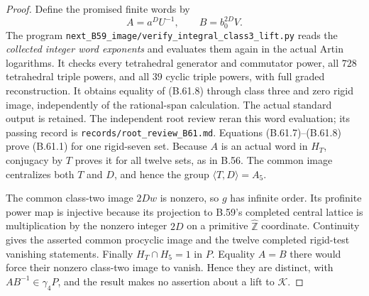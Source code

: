 \begin{proof}
Define the promised finite words by
\[
                       A=a^D U^{-1},\qquad
                       B=b_0^{2D}V.                      \tag{B.61.8}
\]
The program
\nolinkurl{next_B59_image/verify_integral_class3_lift.py}
reads the \emph{collected integer word exponents} and
evaluates them again in the actual Artin logarithms.
It checks every tetrahedral generator and commutator
power, all $728$ tetrahedral triple powers, and all
$39$ cyclic triple powers, with full graded reconstruction.
It obtains equality of (B.61.8) through class three and
zero rigid image, independently of the rational-span
calculation.  The actual standard output is retained.
The independent root review reran this word evaluation;
its passing record is \nolinkurl{records/root_review_B61.md}.
Equations (B.61.7)--(B.61.8) prove (B.61.1) for one
rigid-seven set.  Because $A$ is an actual word in
$H_T$, conjugacy by $T$ proves it for all twelve sets,
as in B.56.
The common image centralizes both $T$ and $D$, and hence
the group $\langle T,D\rangle=A_5$.

The common class-two image $2Dw$ is nonzero, so $g$ has
infinite order.  Its profinite power map is injective
because its projection to B.59's completed central lattice
is multiplication by the nonzero integer $2D$ on a
primitive $\widehat{\mathbb Z}$ coordinate.
Continuity gives the asserted common procyclic image
and the twelve completed rigid-test vanishing statements.
Finally $H_T\cap H_5=1$ in $P$.  Equality $A=B$ there
would force their nonzero class-two image to vanish.
Hence they are distinct, with $AB^{-1}\in\gamma_4P$,
and the result makes no assertion about a lift to
$\mathcal K$.
\end{proof}
